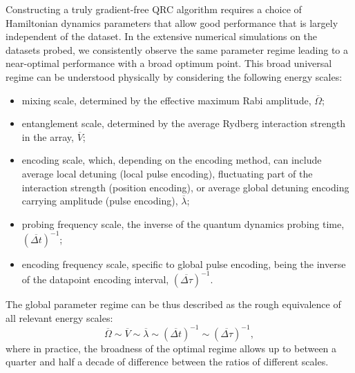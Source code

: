 \documentclass[english,floatfix,twocolumn,showpacs, aps, prx, reprint, superscriptaddress, longbibliography]{revtex4-2}
\begin{document}
Constructing a truly gradient-free QRC algorithm requires a choice of Hamiltonian dynamics parameters that allow good performance that is largely independent of the dataset. In the extensive numerical simulations on the datasets probed, we consistently observe the same parameter regime leading to a near-optimal performance with a broad optimum point. This broad universal regime can be understood physically by considering the following energy scales:
\begin{itemize}
    \item mixing scale, determined by the effective maximum Rabi amplitude, $\overline{\Omega}$;
    \item entanglement scale, determined by the average Rydberg interaction strength in the array, $\overline{V}$;
    \item encoding scale, which, depending on the encoding method, can include average local detuning (local pulse encoding), fluctuating part of the interaction strength (position encoding), or average global detuning encoding carrying amplitude (pulse encoding), $\overline{\lambda}$;
    \item probing frequency scale, the inverse of the quantum dynamics probing time, $(\overline{\Delta t})^{-1}$;
    \item encoding frequency scale, specific to global pulse encoding, being the inverse of the datapoint encoding interval, $(\overline{\Delta \tau})^{-1}$.
\end{itemize}
The global parameter regime can be thus described as the rough equivalence of all relevant energy scales:
\begin{equation}\label{eq:unparam}
    \overline{\Omega} \sim \overline{V} \sim \overline{\lambda} \sim \left(\overline{\Delta t}\right)^{-1} \sim \left(\overline{\Delta \tau}\right)^{-1},
\end{equation}
where in practice, the broadness of the optimal regime allows up to between a quarter and half a decade of difference between the ratios of different scales.
\end{document}
